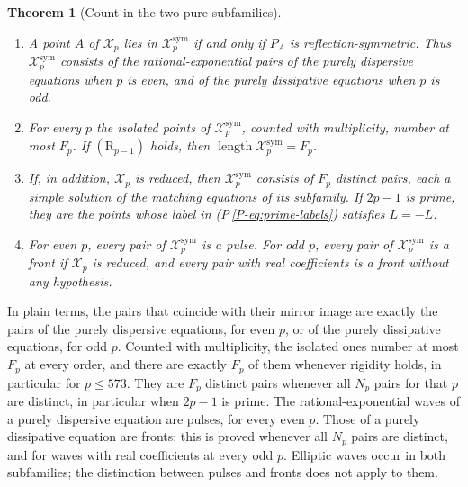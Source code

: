 \documentclass[11pt]{article}
\newtheorem{theorem}{Theorem}[section]
\newcommand{\len}{\operatorname{length}}
\newcommand{\Xp}{\mathcal X_p}
\numberwithin{equation}{section}
\begin{document}
\begin{theorem}[Count in the two pure subfamilies]\label{thm:symmetric}
\begin{enumerate}
\item[\textup{(i)}] A point \(A\) of \(\Xp\) lies in
\(\Xp^{\mathrm{sym}}\) if and only if \(P_A\) is reflection-symmetric.
Thus \(\Xp^{\mathrm{sym}}\) consists of the rational-exponential pairs
of the purely dispersive equations when \(p\) is even, and of the
purely dissipative equations when \(p\) is odd.
\item[\textup{(ii)}] For every \(p\) the isolated points of
\(\Xp^{\mathrm{sym}}\), counted with multiplicity, number at most
\(F_p\). If \((\mathrm R_{p-1})\) holds, then
\(\len\Xp^{\mathrm{sym}}=F_p\).
\item[\textup{(iii)}] If, in addition, \(\Xp\) is reduced, then
\(\Xp^{\mathrm{sym}}\) consists of \(F_p\) distinct pairs, each a simple
solution of the matching equations of its subfamily. If \(2p-1\) is
prime, they are the points whose label in (P\,\ref{P-eq:prime-labels})
satisfies \(L=-L\).
\item[\textup{(iv)}] For even \(p\), every pair of
\(\Xp^{\mathrm{sym}}\) is a pulse. For odd \(p\), every pair of
\(\Xp^{\mathrm{sym}}\) is a front if \(\Xp\) is reduced, and every pair
with real coefficients is a front without any hypothesis.
\end{enumerate}
\end{theorem}

In plain terms, the pairs that coincide with their mirror image are
exactly the pairs of the purely dispersive equations, for even \(p\),
or of the purely dissipative equations, for odd \(p\). Counted with
multiplicity, the isolated ones number at most \(F_p\) at every order,
and there are exactly \(F_p\) of them whenever rigidity holds, in
particular for \(p\le573\). They are \(F_p\) distinct pairs whenever all
\(N_p\) pairs for that \(p\) are distinct, in particular when \(2p-1\)
is prime. The rational-exponential waves of a purely dispersive
equation are pulses, for every even \(p\). Those of a purely
dissipative equation are fronts; this is proved whenever all \(N_p\)
pairs are distinct, and for waves with real coefficients at every odd
\(p\). Elliptic waves occur in both subfamilies; the distinction
between pulses and fronts does not apply to them.
\end{document}
